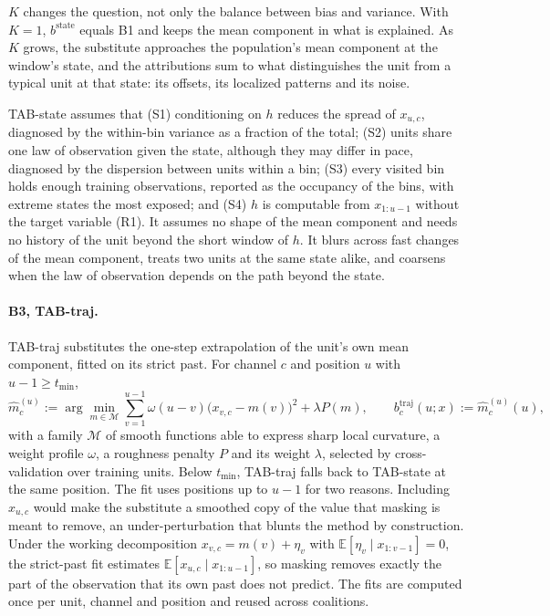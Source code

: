 \documentclass{article}
\begin{document}
$K$ changes the question, not only the balance between bias and variance. With $K=1$, $b^{\mathrm{state}}$ equals B1 and keeps the mean component in what is explained. As $K$ grows, the substitute approaches the population's mean component at the window's state, and the attributions sum to what distinguishes the unit from a typical unit at that state: its offsets, its localized patterns and its noise.

TAB-state assumes that (S1) conditioning on $h$ reduces the spread of $x_{u,c}$, diagnosed by the within-bin variance as a fraction of the total; (S2) units share one law of observation given the state, although they may differ in pace, diagnosed by the dispersion between units within a bin; (S3) every visited bin holds enough training observations, reported as the occupancy of the bins, with extreme states the most exposed; and (S4) $h$ is computable from $x_{1:u-1}$ without the target variable (R1). It assumes no shape of the mean component and needs no history of the unit beyond the short window of $h$. It blurs across fast changes of the mean component, treats two units at the same state alike, and coarsens when the law of observation depends on the path beyond the state.

\paragraph{B3, TAB-traj.} TAB-traj substitutes the one-step extrapolation of the unit's own mean component, fitted on its strict past. For channel $c$ and position $u$ with $u-1\ge t_{\min}$,
\begin{equation}\label{eq:tabtraj}
\hat m^{(u)}_c := \arg\min_{m\in\mathcal{M}} \sum_{v=1}^{u-1}\omega(u-v)\bigl(x_{v,c}-m(v)\bigr)^2 + \lambda P(m),
\qquad b^{\mathrm{traj}}_c(u;x) := \hat m^{(u)}_c(u),
\end{equation}
with a family $\mathcal{M}$ of smooth functions able to express sharp local curvature, a weight profile $\omega$, a roughness penalty $P$ and its weight $\lambda$, selected by cross-validation over training units. Below $t_{\min}$, TAB-traj falls back to TAB-state at the same position. The fit uses positions up to $u-1$ for two reasons. Including $x_{u,c}$ would make the substitute a smoothed copy of the value that masking is meant to remove, an under-perturbation that blunts the method by construction. Under the working decomposition $x_{v,c}=m(v)+\eta_v$ with $\mathbb{E}[\eta_v\mid x_{1:v-1}]=0$, the strict-past fit estimates $\mathbb{E}[x_{u,c}\mid x_{1:u-1}]$, so masking removes exactly the part of the observation that its own past does not predict. The fits are computed once per unit, channel and position and reused across coalitions.
\end{document}
